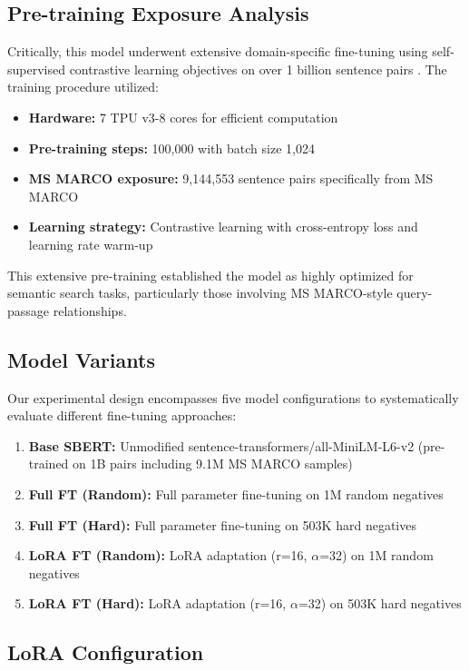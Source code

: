 \subsection{Pre-training Exposure Analysis}

Critically, this model underwent extensive domain-specific fine-tuning using self-supervised contrastive learning objectives on over 1 billion sentence pairs \cite{huggingface_minilm}. The training procedure utilized:

\begin{itemize}
\item \textbf{Hardware:} 7 TPU v3-8 cores for efficient computation
\item \textbf{Pre-training steps:} 100,000 with batch size 1,024
\item \textbf{MS MARCO exposure:} 9,144,553 sentence pairs specifically from MS MARCO
\item \textbf{Learning strategy:} Contrastive learning with cross-entropy loss and learning rate warm-up
\end{itemize}

This extensive pre-training established the model as highly optimized for semantic search tasks, particularly those involving MS MARCO-style query-passage relationships.

\subsection{Model Variants}

Our experimental design encompasses five model configurations to systematically evaluate different fine-tuning approaches:

\begin{enumerate}
\item \textbf{Base SBERT:} Unmodified sentence-transformers/all-MiniLM-L6-v2 (pre-trained on 1B pairs including 9.1M MS MARCO samples)
\item \textbf{Full FT (Random):} Full parameter fine-tuning on 1M random negatives
\item \textbf{Full FT (Hard):} Full parameter fine-tuning on 503K hard negatives
\item \textbf{LoRA FT (Random):} LoRA adaptation (r=16, $\alpha$=32) on 1M random negatives  
\item \textbf{LoRA FT (Hard):} LoRA adaptation (r=16, $\alpha$=32) on 503K hard negatives
\end{enumerate}

\subsection{LoRA Configuration}

